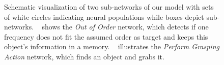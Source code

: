 \begin{figure}[t]
    \centering
    \caption{Schematic visualization of two sub-networks of our model with sets of white circles indicating neural populations while boxes depict sub-networks.
       ~\protect{} shows the \emph{Out of Order} network, which detects if one frequency does not fit the assumed order as target and keeps this object’s information in a memory.
~\protect{} illustrates the \emph{Perform Grasping Action} network, which finds an object and grabs it.
}
    \label{fig:omni_bot_nets}
\end{figure}

